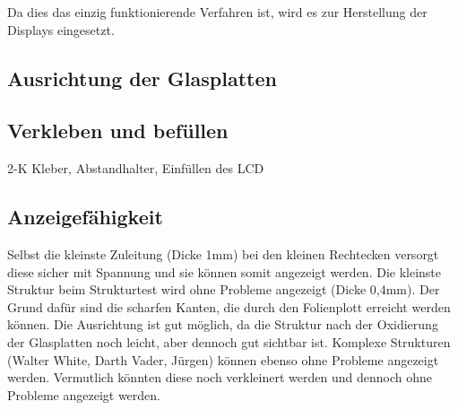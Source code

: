 Da dies das einzig funktionierende Verfahren ist, wird es zur Herstellung der Displays eingesetzt.

\subsection{Ausrichtung der Glasplatten}
\subsection{Verkleben und befüllen}
2-K Kleber, Abstandhalter, Einfüllen des LCD
\subsection{Anzeigefähigkeit}
Selbst die kleinste Zuleitung (Dicke 1mm) bei den kleinen Rechtecken versorgt diese sicher mit Spannung und sie können somit angezeigt werden. Die kleinste Struktur beim Strukturtest wird ohne Probleme angezeigt (Dicke 0,4mm). Der Grund dafür sind die scharfen Kanten, die durch den Folienplott erreicht werden können. Die Ausrichtung ist gut möglich, da die Struktur nach der Oxidierung der Glasplatten noch leicht, aber dennoch gut sichtbar ist. Komplexe Strukturen (Walter White, Darth Vader, Jürgen) können ebenso ohne Probleme angezeigt werden. Vermutlich könnten diese noch verkleinert werden und dennoch ohne Probleme angezeigt werden.

